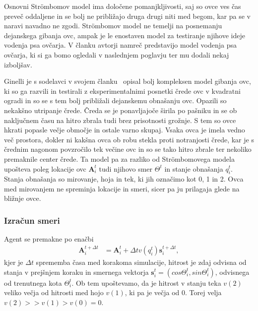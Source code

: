 Osnovni Str{\"o}mbomov model ima določene pomanjkljivosti, saj so ovce ves čas preveč oddaljene in se bolj ne približajo druga drugi niti med begom, kar pa se v naravi navadno ne zgodi. Str{\"o}mbomov model ne temelji na posnemanju dejanskega gibanja ovc, ampak je le enostaven model za testiranje njihove ideje vodenja psa ovčarja. V članku avtorji namreč predstavijo model vodenja psa ovčarja, ki si ga bomo ogledali v naslednjem poglavju ter mu dodali nekaj izboljšav.

Ginelli je s sodelavci v svojem članku~\cite{Ginelli} opisal bolj kompleksen model gibanja ovc, ki so ga razvili in testirali z eksperimentalnimi posnetki črede ovc v kvadratni ogradi in so se s tem bolj približali dejanskemu obnašanju ovc. Opazili so nekakšno utripanje črede. Čreda se je ponavljajoče širila po pašniku in se ob naključnem času na hitro zbrala tudi brez prisotnosti grožnje. S tem so ovce hkrati popasle večje območje in ostale varno skupaj. Vsaka ovca je imela vedno več prostora, dokler ni kakšna ovca ob robu stekla proti notranjosti črede, kar je s črednim nagonom povzročilo tek večine ovc in so se tako hitro zbrale ter nekoliko premaknile center črede. Ta model pa za razliko od Str{\"o}mbomovega modela upošteva poleg lokacije ovc $\mathbf{A}_i^t$ tudi njihovo smer $\Theta^t$ in stanje obnašanja $q_i^t$. Stanja obnašanja so mirovanje, hoja in tek, ki jih označimo kot 0, 1 in 2. Ovca med mirovanjem ne spreminja lokacije in smeri, sicer pa ju prilagaja glede na bližnje ovce.

\subsubsection{Izračun smeri}

Agent se premakne po enačbi
\begin{align}
\mathbf{A}_i^{t+\Delta t} &= \mathbf{A}_i^t + \Delta tv(q_i^t)\mathbf{s}_i^{t+\Delta t}, \label{eq:ginelli-premik}
\end{align}
kjer je $\Delta t$ sprememba časa med korakoma simulacije, hitrost je zdaj odvisna od stanja v prejšnjem koraku in smernega vektorja $\mathbf{s}_i^t = (cos\Theta_i^t, sin\Theta_i^t)$, odvisnega od trenutnega kota $\Theta_i^t$. Ob tem upoštevamo, da je hitrost v stanju teka $v(2)$ veliko večja od hitrosti med hojo $v(1)$, ki pa je večja od 0. Torej velja $v(2) >> v(1) > v(0) = 0$.

